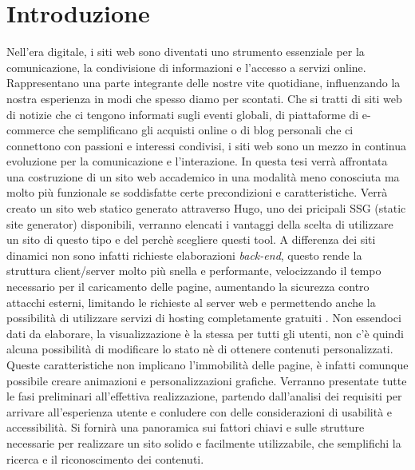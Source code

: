 \documentclass[target=bach,aauheader=]{thud}
\begin{document}
\chapter{Introduzione}
Nell'era digitale, i siti web sono diventati uno strumento essenziale per la comunicazione, la condivisione di informazioni e l'accesso a servizi online. 
Rappresentano una parte integrante delle nostre vite quotidiane, influenzando la nostra esperienza in modi che spesso diamo per scontati. 
Che si tratti di siti web di notizie che ci tengono informati sugli eventi globali, di piattaforme di e-commerce che semplificano gli acquisti online o di blog personali che ci connettono con passioni e interessi condivisi, i siti web sono un mezzo in continua evoluzione per la comunicazione e l'interazione.
\newline \newline
In questa tesi verrà affrontata una costruzione di un sito web accademico in una modalità meno conosciuta ma molto più funzionale se soddisfatte certe precondizioni e caratteristiche. 
Verrà creato un sito web statico generato attraverso Hugo, uno dei pricipali SSG (static site generator) disponibili, verranno elencati i vantaggi della scelta di utilizzare un sito di questo tipo e del perchè scegliere questi tool.  
\newline
A differenza dei siti dinamici non sono infatti richieste elaborazioni \textit{back-end}, questo rende la struttura client/server molto più snella e performante, velocizzando il tempo necessario per il caricamento delle pagine, aumentando la sicurezza contro attacchi esterni, limitando le richieste al server web e permettendo anche la possibilità di utilizzare servizi di hosting completamente gratuiti \cite{static-dinamic}.     
Non essendoci dati da elaborare, la visualizzazione è la stessa per tutti gli utenti, non c'è quindi alcuna possibilità di modificare lo stato nè di ottenere contenuti personalizzati.  
Queste caratteristiche non implicano l'immobilità delle pagine, è infatti comunque possibile creare animazioni e personalizzazioni grafiche.
\newline \newline
Verranno presentate tutte le fasi preliminari all'effettiva realizzazione, partendo dall'analisi dei requisiti per arrivare all'esperienza utente e conludere con delle considerazioni di usabilità e accessibilità.
Si fornirà una panoramica sui fattori chiavi e sulle strutture necessarie per realizzare un sito solido e facilmente utilizzabile, che semplifichi la ricerca e il riconoscimento dei contenuti. 
\end{document}
